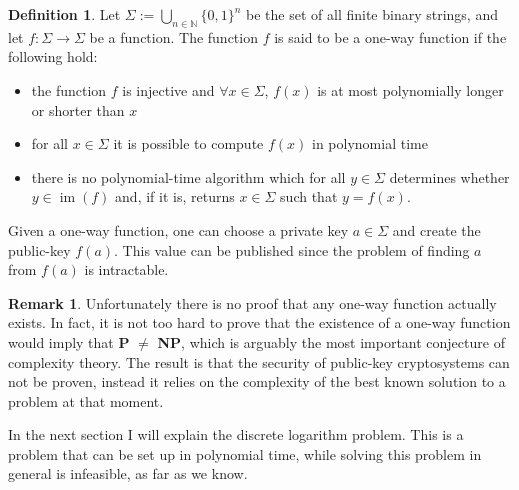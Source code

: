 \documentclass{article}
\numberwithin{equation}{section}
\theoremstyle{definition}
\newtheorem{definition}[theorem]{Definition}
\newtheorem{remark}[theorem]{Remark}
\newcommand{\NN}{{\mathbb N}} %
\newcommand{\bstring}{\Sigma} %
\newcommand{\image}[1]{\operatorname{im} \left(#1\right)} %
\begin{document}
\begin{definition}
Let $\bstring:=\bigcup_{n \in \NN} \{0,1\}^n$ be the set of all finite binary strings, and let $f: \bstring \rightarrow \bstring$ be a function. The function $f$ is said to be a one-way function if the following hold:
\begin{itemize}
\item the function $f$ is injective and $\forall x \in \bstring$, $f(x)$ is at most polynomially longer or shorter than $x$
\item for all $x \in \bstring$ it is possible to compute $f(x)$ in polynomial time
\item there is no polynomial-time algorithm which for all $y \in \bstring$ determines whether $y \in \image f$ and, if it is, returns $x \in \bstring$ such that $y=f(x)$.
\end{itemize}
\end{definition}

Given a one-way function, one can choose a private key $a \in \bstring$ and create the public-key $f(a)$. This value can be published since the problem of finding $a$ from $f(a)$ is intractable. 

\begin{remark}
Unfortunately there is no proof that any one-way function actually exists. In fact, it is not too hard to prove that the existence of a one-way function would imply that {\bf P} $\neq$ {\bf NP}, which is arguably the most important conjecture of complexity theory. The result is that the security of public-key cryptosystems can not be proven, instead it relies on the complexity of the best known solution to a problem at that moment. 
\end{remark}

In the next section I will explain the discrete logarithm problem. This is a problem that can be set up in polynomial time, while solving this problem in general is infeasible, as far as we know. 
\end{document}
